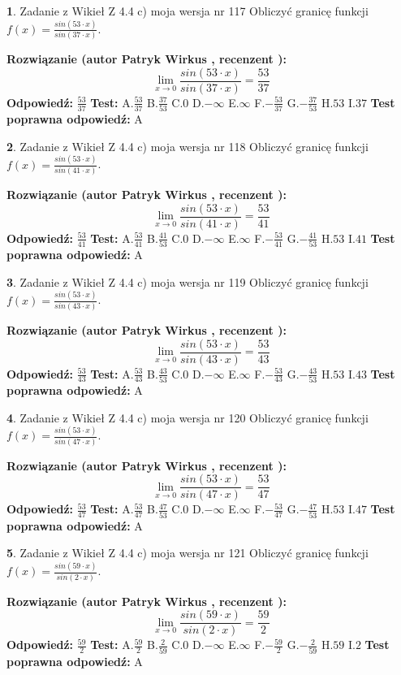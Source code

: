 \documentclass[12pt, a4paper]{article}
\theoremstyle{definition} %
\newtheorem{zad}{}
\newcommand{\zadStart}[1]{\begin{zad}#1\newline}
\newcommand{\zadStop}{\end{zad}}
\newcommand{\rozwStart}[2]{\noindent \textbf{Rozwiązanie (autor #1 , recenzent #2): }\newline}
\newcommand{\rozwStop}{\newline}
\newcommand{\odpStart}{\noindent \textbf{Odpowiedź:}\newline}
\newcommand{\odpStop}{\newline}
\newcommand{\testStart}{\noindent \textbf{Test:}\newline}
\newcommand{\testStop}{\newline}
\newcommand{\kluczStart}{\noindent \textbf{Test poprawna odpowiedź:}\newline}
\newcommand{\kluczStop}{\newline}
\begin{document}
\zadStart{Zadanie z Wikieł Z 4.4 c) moja wersja nr 117}
Obliczyć granicę funkcji $f(x)=\frac{sin(53\cdot x)}{sin(37\cdot x)}$.
\zadStop
\rozwStart{Patryk Wirkus}{}
$$\lim\limits_{x\to 0}\frac{sin(53\cdot x)}{sin(37\cdot x)}=
\frac{53}{37}$$
\rozwStop
\odpStart
$\frac{53}{37}$
\odpStop
\testStart
A.$\frac{53}{37}$
B.$\frac{37}{53}$
C.$0$
D.$-\infty$
E.$\infty$
F.$-\frac{53}{37}$
G.$-\frac{37}{53}$
H.$53$
I.$37$
\testStop
\kluczStart
A
\kluczStop



\zadStart{Zadanie z Wikieł Z 4.4 c) moja wersja nr 118}
Obliczyć granicę funkcji $f(x)=\frac{sin(53\cdot x)}{sin(41\cdot x)}$.
\zadStop
\rozwStart{Patryk Wirkus}{}
$$\lim\limits_{x\to 0}\frac{sin(53\cdot x)}{sin(41\cdot x)}=
\frac{53}{41}$$
\rozwStop
\odpStart
$\frac{53}{41}$
\odpStop
\testStart
A.$\frac{53}{41}$
B.$\frac{41}{53}$
C.$0$
D.$-\infty$
E.$\infty$
F.$-\frac{53}{41}$
G.$-\frac{41}{53}$
H.$53$
I.$41$
\testStop
\kluczStart
A
\kluczStop



\zadStart{Zadanie z Wikieł Z 4.4 c) moja wersja nr 119}
Obliczyć granicę funkcji $f(x)=\frac{sin(53\cdot x)}{sin(43\cdot x)}$.
\zadStop
\rozwStart{Patryk Wirkus}{}
$$\lim\limits_{x\to 0}\frac{sin(53\cdot x)}{sin(43\cdot x)}=
\frac{53}{43}$$
\rozwStop
\odpStart
$\frac{53}{43}$
\odpStop
\testStart
A.$\frac{53}{43}$
B.$\frac{43}{53}$
C.$0$
D.$-\infty$
E.$\infty$
F.$-\frac{53}{43}$
G.$-\frac{43}{53}$
H.$53$
I.$43$
\testStop
\kluczStart
A
\kluczStop



\zadStart{Zadanie z Wikieł Z 4.4 c) moja wersja nr 120}
Obliczyć granicę funkcji $f(x)=\frac{sin(53\cdot x)}{sin(47\cdot x)}$.
\zadStop
\rozwStart{Patryk Wirkus}{}
$$\lim\limits_{x\to 0}\frac{sin(53\cdot x)}{sin(47\cdot x)}=
\frac{53}{47}$$
\rozwStop
\odpStart
$\frac{53}{47}$
\odpStop
\testStart
A.$\frac{53}{47}$
B.$\frac{47}{53}$
C.$0$
D.$-\infty$
E.$\infty$
F.$-\frac{53}{47}$
G.$-\frac{47}{53}$
H.$53$
I.$47$
\testStop
\kluczStart
A
\kluczStop



\zadStart{Zadanie z Wikieł Z 4.4 c) moja wersja nr 121}
Obliczyć granicę funkcji $f(x)=\frac{sin(59\cdot x)}{sin(2\cdot x)}$.
\zadStop
\rozwStart{Patryk Wirkus}{}
$$\lim\limits_{x\to 0}\frac{sin(59\cdot x)}{sin(2\cdot x)}=
\frac{59}{2}$$
\rozwStop
\odpStart
$\frac{59}{2}$
\odpStop
\testStart
A.$\frac{59}{2}$
B.$\frac{2}{59}$
C.$0$
D.$-\infty$
E.$\infty$
F.$-\frac{59}{2}$
G.$-\frac{2}{59}$
H.$59$
I.$2$
\testStop
\kluczStart
A
\kluczStop
\end{document}
